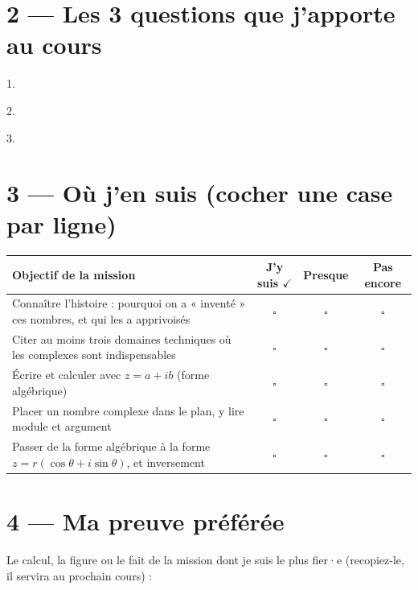 \documentclass[11pt,a4paper]{article}
\renewcommand{\arraystretch}{1.4}
\newcommand{\case}{$\square$}
\newcommand{\pointilles}{\makebox[3.5cm]{\dotfill}}
\newcommand{\pointilleslarge}{\makebox[0.92\textwidth]{\dotfill}}
\begin{document}
\section*{2 --- Les 3 questions que j'apporte au cours}

1. \pointilleslarge

2. \pointilleslarge

3. \pointilleslarge

\section*{3 --- Où j'en suis (cocher une case par ligne)}

\begin{center}
\renewcommand{\arraystretch}{2}
\begin{tabularx}{\textwidth}{|X|c|c|c|}
  \hline
  \textbf{Objectif de la mission} & \textbf{J'y suis $\checkmark$}
  & \textbf{Presque} & \textbf{Pas encore} \\ \hline
  Connaître l'histoire : pourquoi on a « inventé » ces nombres, et qui les a
  apprivoisés & \case{} & \case{} & \case{} \\ \hline
  Citer au moins trois domaines techniques où les complexes sont
  indispensables & \case{} & \case{} & \case{} \\ \hline
  Écrire et calculer avec $z = a + ib$ (forme algébrique)
  & \case{} & \case{} & \case{} \\ \hline
  Placer un nombre complexe dans le plan, y lire module et argument
  & \case{} & \case{} & \case{} \\ \hline
  Passer de la forme algébrique à la forme $z = r(\cos\theta + i\sin\theta)$,
  et inversement & \case{} & \case{} & \case{} \\ \hline
\end{tabularx}
\end{center}

\section*{4 --- Ma preuve préférée}

Le calcul, la figure ou le fait de la mission dont je suis le plus fier·e
(recopiez-le, il servira au prochain cours) :

\pointilles\par\pointilles\par\pointilles
\end{document}
